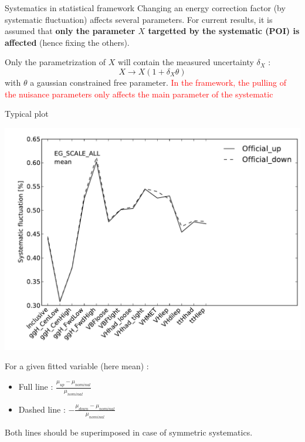 \begin{frame}{Systematics in statistical framework}
  Changing an energy correction factor (by systematic fluctuation) affects several parameters.
  For current results, it is assumed that {\bf only the parameter $X$ targetted by the systematic (POI) is affected} (hence fixing the others).

  Only the parametrization of $X$ will contain the measured uncertainty $\delta_X$ :
  $$X\rightarrow X(1+\delta_X\theta)$$
  with $\theta$ a gaussian constrained free parameter.
  \vfill
  \textcolor{red}{In the framework, the pulling of the nuisance parameters only affects the main parameter of the systematic}
\end{frame}

\begin{frame}{Typical plot}
  \begin{minipage}{0.49\linewidth}
    \includegraphics[width=\linewidth]{plots/h013_ICHEP_PhotonSyst_EG_SCALE_ALL_mean.pdf}\\
  \end{minipage}
  \begin{minipage}{0.49\linewidth}
    For a given fitted variable (here mean) :
    \begin{itemize}
    \item Full line : $\frac{\mu_{up}-\mu_{nominal}}{\mu_{nominal}}$
    \item Dashed line : $-\frac{\mu_{down}-\mu_{nominal}}{\mu_{nominal}}$
 
    \end{itemize}
  \end{minipage}

  Both lines should be superimposed in case of symmetric systematics.
  \end{frame}
